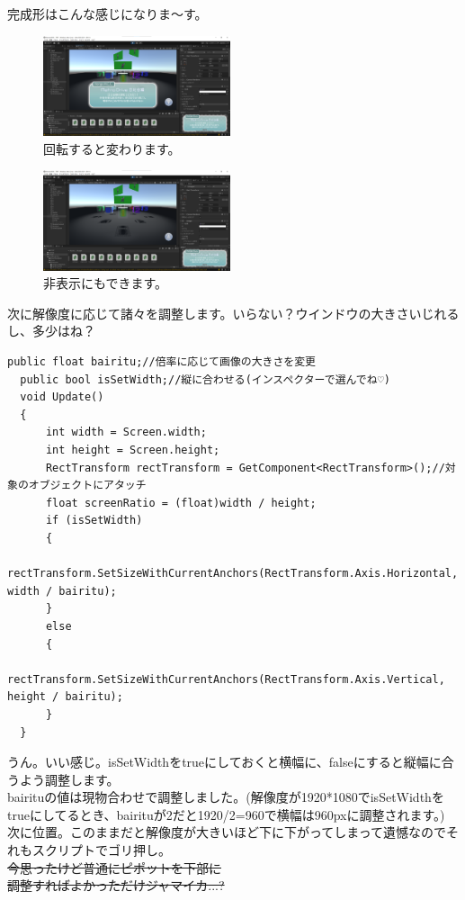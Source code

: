 \documentclass[b5paper,9pt,platex,dvipdfmx]{jsarticle}
\begin{document}
\begin{multicols*}{3}
完成形はこんな感じになりま～す。\\
\begin{figure}[H]
  \centering
  \includegraphics[width=5.5cm]{5.png}
  \caption{回転すると変わります。}
\end{figure}
\begin{figure}[H]
  \centering
  \includegraphics[width=5.5cm]{6.png}
  \caption{非表示にもできます。}
\end{figure}
次に解像度に応じて諸々を調整します。いらない？ウインドウの大きさいじれるし、多少はね？\\
\begin{lstlisting}[caption=DisplaySet.cs]
  public float bairitu;//倍率に応じて画像の大きさを変更
  public bool isSetWidth;//縦に合わせる(インスペクターで選んでね♡)
  void Update()
  {
      int width = Screen.width;
      int height = Screen.height;
      RectTransform rectTransform = GetComponent<RectTransform>();//対象のオブジェクトにアタッチ
      float screenRatio = (float)width / height;
      if (isSetWidth)
      {
          rectTransform.SetSizeWithCurrentAnchors(RectTransform.Axis.Horizontal, width / bairitu);
      }
      else
      {
          rectTransform.SetSizeWithCurrentAnchors(RectTransform.Axis.Vertical, height / bairitu);
      }
  }
\end{lstlisting}
うん。いい感じ。isSetWidthをtrueにしておくと横幅に、falseにすると縦幅に合うよう調整します。\\
bairituの値は現物合わせで調整しました。(解像度が1920*1080でisSetWidthをtrueにしてるとき、bairituが2だと1920/2=960で横幅は960pxに調整されます。)\\
次に位置。このままだと解像度が大きいほど下に下がってしまって遺憾なのでそれもスクリプトでゴリ押し。\\
\sout{今思ったけど普通にピポットを下部に}\\
\sout{調整すればよかっただけジャマイカ...?}\\

\end{multicols*}
\end{document}
